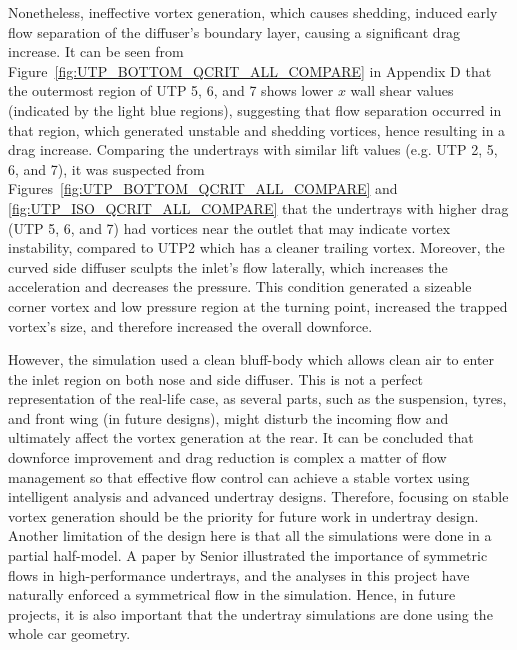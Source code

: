 \noindent Nonetheless, ineffective vortex generation, which causes shedding, induced early flow separation of the diffuser's boundary layer, causing a significant drag increase. It can be seen from Figure~\ref{fig:UTP_BOTTOM_QCRIT_ALL_COMPARE} in Appendix D that the outermost region of UTP 5, 6, and 7 shows lower $x$ wall shear values (indicated by the light blue regions), suggesting that flow separation occurred in that region, which generated unstable and shedding vortices, hence resulting in a drag increase. Comparing the undertrays with similar lift values (e.g. UTP 2, 5, 6, and 7), it was suspected from Figures~\ref{fig:UTP_BOTTOM_QCRIT_ALL_COMPARE} and \ref{fig:UTP_ISO_QCRIT_ALL_COMPARE} that the undertrays with higher drag (UTP 5, 6, and 7) had vortices near the outlet that may indicate vortex instability, compared to UTP2 which has a cleaner trailing vortex. Moreover, the curved side diffuser sculpts the inlet's flow laterally, which increases the acceleration and decreases the pressure. This condition generated a sizeable corner vortex and low pressure region at the turning point, increased the trapped vortex's size, and therefore increased the overall downforce.

\noindent However, the simulation used a clean bluff-body which allows clean air to enter the inlet region on both nose and side diffuser. This is not a perfect representation of the real-life case, as several parts, such as the suspension, tyres, and front wing (in future designs), might disturb the incoming flow and ultimately affect the vortex generation at the rear. It can be concluded that downforce improvement and drag reduction is complex a matter of flow management so that effective flow control can achieve a stable vortex using intelligent analysis and advanced undertray designs. Therefore, focusing on stable vortex generation should be the priority for future work in undertray design. Another limitation of the design here is that all the simulations were done in a partial half-model. A paper by Senior \cite{Senior2001TheEffect} illustrated the importance of symmetric flows in high-performance undertrays, and the analyses in this project have naturally enforced a symmetrical flow in the simulation. Hence, in future projects, it is also important that the undertray simulations are done using the whole car geometry.
















